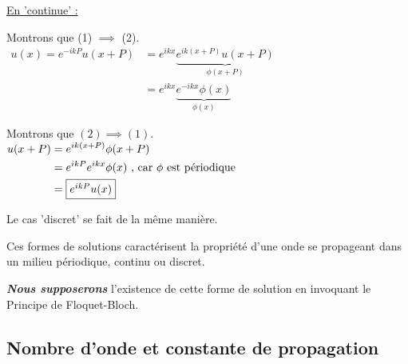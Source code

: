 \documentclass[12pt,a4paper]{article}
\begin{document}
	\begin{dem}
		\underline{En 'continue' :}\\
		\begin{minipage}[t]{10cm}
			Montrons que (1) $\implies$ (2).\\
			$\begin{aligned}
				u(x) = e^{-ikP}u(x+P) 
				&= e^{ikx} \underbrace{e^{ik(x+P)}u(x+P)}_{\phi(x+P)}\\
				&=e^{ikx} \underbrace{e^{-ikx}\phi(x)}_{\phi(x)}
			\end{aligned}$
		\end{minipage}\begin{minipage}[t]{12.5cm}
			Montrons que $(2) \implies (1)$.\\
			$\begin{aligned}
				u(x+P) 
				&= e^{ik(x+P)}\phi(x+P)\\
				&= e^{ikP}e^{ikx}\phi(x) \text{ , car } \phi \text{ est périodique}\\
				&= \fbox{$e^{ikP}u(x)$}
			\end{aligned}
			$
		\end{minipage}
		
		\vspace{.5cm}
		
		Le cas 'discret' se fait de la même manière.
	\end{dem}
	
	Ces formes de solutions caractérisent la propriété d'une onde se propageant dans un milieu périodique, continu ou discret.
	
	\textbf{\textit{Nous supposerons}} l'existence de cette forme de solution en invoquant le Principe de Floquet-Bloch.
	
	\subsection{Nombre d'onde et constante de propagation}
	
\end{document}
